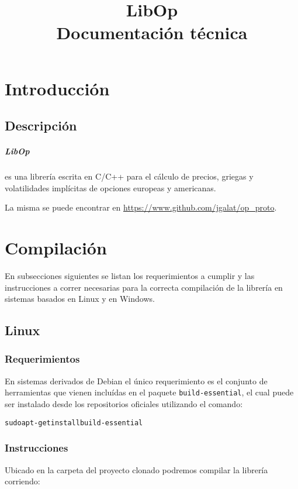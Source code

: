 \documentclass[12pt,a4paper,final]{article}
\author{}
\title{LibOp \\ Documentación técnica}
\date{}
\begin{document}
\maketitle

\tableofcontents

\clearpage

\section{Introducción}


\subsection{Descripción}
	\subparagraph{LibOp} es una librería escrita en C/C++ para el cálculo de 
	precios, griegas y volatilidades implícitas de opciones europeas y americanas.
	
	La misma se puede encontrar en \newline{} \url{https://www.github.com/jgalat/op\_proto}.
	
\section{Compilación}
	En subsecciones siguientes se listan los requerimientos a cumplir y las instrucciones
	a correr necesarias para la correcta compilación de la librería en sistemas basados
	en Linux y en Windows. 	 
	
	\subsection{Linux}
		
		\subsubsection{Requerimientos}
			En sistemas derivados de Debian el único requerimiento es el conjunto de 
			herramientas que vienen incluídas en el paquete \texttt{build-essential},
			el cual puede ser instalado desde los repositorios
			oficiales utilizando el comando:
			
			\begin{alltt}
				sudo apt-get install build-essential
			\end{alltt}	
			
		\subsubsection{Instrucciones}
			Ubicado en la carpeta del proyecto clonado podremos compilar la librería corriendo:
			
\end{document}
